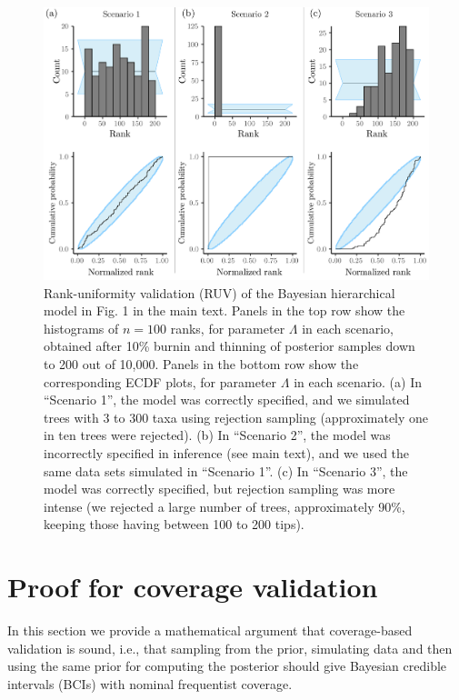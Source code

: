 \documentclass[oneside]{article}
\begin{document}
\begin{figure}[!ht]
   \includegraphics[width=\linewidth]{../figures/sbc_Yule_lambda_manual.pdf}
  \caption{Rank-uniformity validation (RUV) of the Bayesian hierarchical model in Fig. 1 in the main text.
    Panels in the top row show the histograms of $n=100$ ranks, for parameter $\Lambda$ in each scenario, obtained after 10\% burnin and thinning of posterior samples down to 200 out of 10,000.
    Panels in the bottom row show the corresponding ECDF plots, for parameter $\Lambda$ in each scenario.
    (a) In ``Scenario 1'', the model was correctly specified, and we simulated trees with 3 to 300 taxa using rejection sampling (approximately one in ten trees were rejected).
    (b) In ``Scenario 2'', the model was incorrectly specified in inference (see main text), and we used the same data sets simulated in ``Scenario 1''.
    (c) In ``Scenario 3'', the model was correctly specified, but rejection sampling was more intense (we rejected a large number of trees, approximately 90\%, keeping those having between 100 to 200 tips).
   }
  \label{fig:ruv_yule_lambda}
\end{figure}


\newpage
\section{Proof for coverage validation}
 \label{appendix::sec:proofs}

In this section we provide a mathematical argument that coverage-based validation is sound, i.e., that sampling from the prior, simulating data and then using the same prior for computing the posterior should give Bayesian credible intervals (BCIs) with nominal frequentist coverage.
\end{document}
